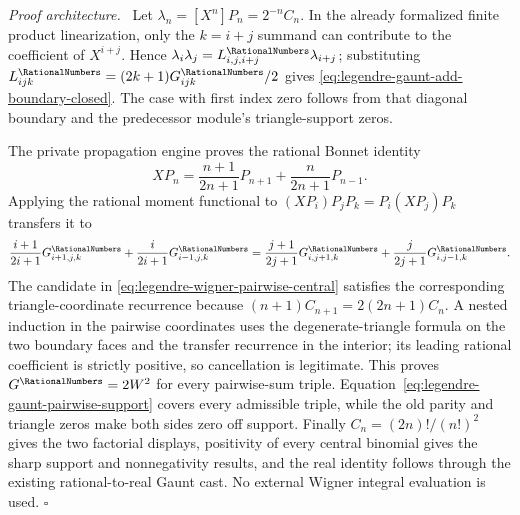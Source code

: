 \documentclass[11pt,oneside]{article}
\theoremstyle{definition}
\theoremstyle{remark}
\newenvironment{proofidea}{\par\smallskip\noindent\textit{Proof architecture.}\ }{\hfill$\square$\par\smallskip}
\begin{document}
\begin{proofidea}
Let \(\lambda_n=[X^n]P_n=2^{-n}C_n\).  In the already formalized finite product
linearization, only the \(k=i+j\) summand can contribute to the coefficient of
\(X^{i+j}\).  Hence
\(\lambda_i\lambda_j=L^{\RationalNumbers}_{i,j,i+j}\lambda_{i+j}\); substituting
\(L^{\RationalNumbers}_{ijk}=(2k+1)G^{\RationalNumbers}_{ijk}/2\) gives
\eqref{eq:legendre-gaunt-add-boundary-closed}.  The case with first index zero follows
from that diagonal boundary and the predecessor module's triangle-support zeros.

The private propagation engine proves the rational Bonnet identity
\[
 XP_n=\frac{n+1}{2n+1}P_{n+1}+\frac n{2n+1}P_{n-1}.
\]
Applying the rational moment functional to
\((XP_i)P_jP_k=P_i(XP_j)P_k\) transfers it to
\[
 \frac{i+1}{2i+1}G^{\RationalNumbers}_{i+1,j,k}
 +\frac{i}{2i+1}G^{\RationalNumbers}_{i-1,j,k}
 =\frac{j+1}{2j+1}G^{\RationalNumbers}_{i,j+1,k}
 +\frac{j}{2j+1}G^{\RationalNumbers}_{i,j-1,k}.
\]
The candidate in \eqref{eq:legendre-wigner-pairwise-central} satisfies the corresponding
triangle-coordinate recurrence because
\((n+1)C_{n+1}=2(2n+1)C_n\).  A nested induction in the pairwise coordinates uses the
degenerate-triangle formula on the two boundary faces and the transfer recurrence in the
interior; its leading rational coefficient is strictly positive, so cancellation is
legitimate.  This proves \(G^{\RationalNumbers}=2W^2\) for every pairwise-sum triple.
Equation~\eqref{eq:legendre-gaunt-pairwise-support} covers every admissible triple, while
the old parity and triangle zeros make both sides zero off support.  Finally
\(C_n=(2n)!/(n!)^2\) gives the two factorial displays, positivity of every central binomial
gives the sharp support and nonnegativity results, and the real identity follows through
the existing rational-to-real Gaunt cast.  No external Wigner integral evaluation is used.
\end{proofidea}
\end{document}
